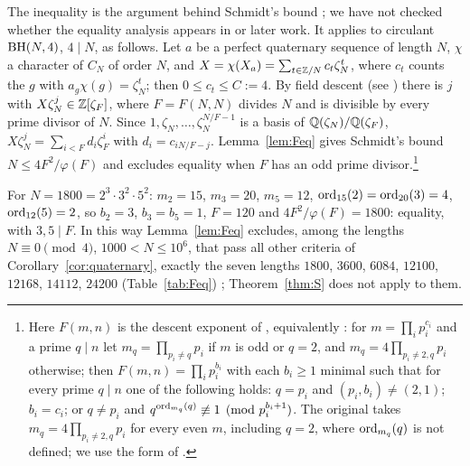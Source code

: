 The inequality is the argument behind Schmidt's bound
\cite{Schmidt1999,LeungSchmidt2005}; we have not checked whether the
equality analysis appears in \cite{Schmidt2002LNM} or later work. It
applies to circulant $\operatorname{BH}(N,4)$, $4\mid N$, as follows. Let $a$ be a perfect quaternary sequence of length $N$, $\chi$ a
character of $C_N$ of order $N$, and $X=\chi(X_a)=\sum_{t\in\mathbb{Z}/N}c_t
\zeta_N^t$, where $c_t$ counts the $g$ with $a_g\chi(g)=\zeta_N^t$; then
$0\le c_t\le C:=4$. By field descent \cite{Schmidt1999,LeungSchmidt2005}
(see \cite[Result~2.8]{DoDuc2019}) there is $j$ with
$X\zeta_N^j\in\mathbb{Z}[\zeta_F]$, where $F=F(N,N)$ divides $N$ and is divisible
by every prime divisor of $N$. Since $1,\zeta_N,\dots,\zeta_N^{N/F-1}$
is a basis of $\mathbb{Q}(\zeta_N)/\mathbb{Q}(\zeta_F)$, $X\zeta_N^j=\sum_{i<F}d_i
\zeta_F^i$ with $d_i=c_{iN/F-j}$. Lemma~\ref{lem:Feq} gives Schmidt's
bound $N\le 4F^2/\varphi(F)$ and excludes equality when $F$ has an odd
prime divisor.\footnote{Here $F(m,n)$ is the descent exponent of
\cite[Def.~2.6]{LeungSchmidt2005}, equivalently
\cite[Def.~2.10]{LeungSchmidt2012}: for $m=\prod_ip_i^{c_i}$ and a prime
$q\mid n$ let $m_q=\prod_{p_i\ne q}p_i$ if $m$ is odd or $q=2$, and
$m_q=4\prod_{p_i\ne2,q}p_i$ otherwise; then $F(m,n)=\prod_ip_i^{b_i}$
with each $b_i\ge1$ minimal such that for every prime $q\mid n$ one of
the following holds: $q=p_i$ and $(p_i,b_i)\ne(2,1)$; $b_i=c_i$; or
$q\ne p_i$ and $q^{\operatorname{ord}_{m_q}(q)}\not\equiv1\pmod{p_i^{b_i+1}}$. The
original \cite[Def.~3.1]{Schmidt1999} takes $m_q=4\prod_{p_i\ne2,q}p_i$
for every even $m$, including $q=2$, where $\operatorname{ord}_{m_q}(q)$ is not
defined; we use the form of \cite{LeungSchmidt2005,LeungSchmidt2012}.}

For $N=1800=2^3\cdot3^2\cdot5^2$: $m_2=15$, $m_3=20$, $m_5=12$,
$\operatorname{ord}_{15}(2)=\operatorname{ord}_{20}(3)=4$, $\operatorname{ord}_{12}(5)=2$, so $b_2=3$, $b_3=b_5=1$,
$F=120$ and $4F^2/\varphi(F)=1800$: equality, with $3,5\mid F$. In this
way Lemma~\ref{lem:Feq} excludes, among the lengths $N\equiv0\pmod4$,
$1000<N\le10^6$, that pass all other criteria of
Corollary~\ref{cor:quaternary}, exactly the seven lengths $1800$, $3600$,
$6084$, $12100$, $12168$, $14112$, $24200$ (Table~\ref{tab:Feq})
; Theorem~\ref{thm:S} does not apply to them.

